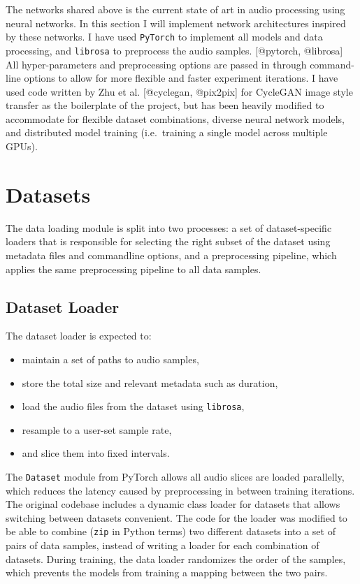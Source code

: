\documentclass[]{report}
\providecommand{\tightlist}{%
  \setlength{\itemsep}{0pt}\setlength{\parskip}{0pt}}
\begin{document}
The networks shared above is the current state of art in audio
processing using neural networks. In this section I will implement
network architectures inspired by these networks. I have used
\texttt{PyTorch} to implement all models and data processing, and
\texttt{librosa} to preprocess the audio samples. {[}@pytorch,
@librosa{]} All hyper-parameters and preprocessing options are passed in
through command-line options to allow for more flexible and faster
experiment iterations. I have used code written by Zhu et al.
{[}@cyclegan, @pix2pix{]} for CycleGAN image style transfer as the
boilerplate of the project, but has been heavily modified to accommodate
for flexible dataset combinations, diverse neural network models, and
distributed model training (i.e.~training a single model across multiple
GPUs).

\hypertarget{datasets}{%
\section{Datasets}\label{datasets}}

The data loading module is split into two processes: a set of
dataset-specific loaders that is responsible for selecting the right
subset of the dataset using metadata files and commandline options, and
a preprocessing pipeline, which applies the same preprocessing pipeline
to all data samples.

\hypertarget{dataset-loader}{%
\subsection{Dataset Loader}\label{dataset-loader}}

The dataset loader is expected to:

\begin{itemize}
\tightlist
\item
  maintain a set of paths to audio samples,
\item
  store the total size and relevant metadata such as duration,
\item
  load the audio files from the dataset using \texttt{librosa},
\item
  resample to a user-set sample rate,
\item
  and slice them into fixed intervals.
\end{itemize}

The \texttt{Dataset} module from PyTorch allows all audio slices are
loaded parallelly, which reduces the latency caused by preprocessing in
between training iterations. The original codebase includes a dynamic
class loader for datasets that allows switching between datasets
convenient. The code for the loader was modified to be able to combine
(\texttt{zip} in Python terms) two different datasets into a set of
pairs of data samples, instead of writing a loader for each combination
of datasets. During training, the data loader randomizes the order of
the samples, which prevents the models from training a mapping between
the two pairs.
\end{document}
